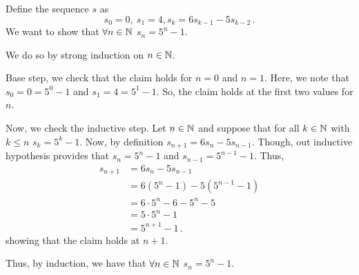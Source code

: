 \guard



\begin{exmp}
\label{exmp:recurrenceRelation}
  Define the sequence $s$ as \[ s_0=0,~s_1=4,s_k=6s_{k-1}-5s_{k-2}\,.\]
  We want to show that $\forall n\in\mathbb{N}$ $s_n = 5^n-1$.

  We do so by strong induction on $n\in\mathbb{N}$.

  Base step, we check that the claim holds for $n=0$ and $n=1$.
  Here, we note that $s_0 = 0 = 5^0-1$ and $s_1 = 4 = 5^1-1$.
  So, the claim holds at the first two values for $n$.

  Now, we check the inductive step.
  Let $n\in\mathbb{N}$ and suppose that for all $k\in\mathbb{N}$ with $k\leq n$ $s_k = 5^k-1$.
  Now, by definition $s_{n+1} = 6 s_n - 5 s_{n-1}$.
  Though, out inductive hypothesis provides that $s_n = 5^n-1 $ and $s_{n-1}=5^{n-1}-1$.
  Thus,
  \begin{align*}
    s_{n+1} &= 6 s_n - 5 s_{n-1} \\
            &= 6 ( 5^n - 1 ) - 5 ( 5^{n-1} - 1 ) \\
            &= 6\cdot 5^n - 6 - 5^n - 5 \\
            &= 5\cdot 5^n - 1 \\
            &= 5^{n+1} - 1\,.
  \end{align*}
  showing that the claim holds at $n+1$.

  Thus, by induction, we have that $\forall n\in\mathbb{N}$ $s_n = 5^n-1$.
\end{exmp}
